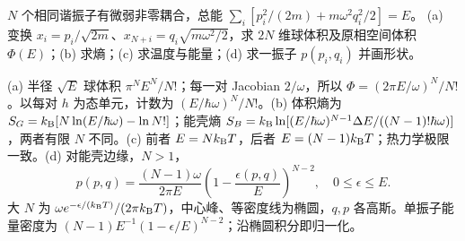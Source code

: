 \begin{exercise}
$N$ 个相同谐振子有微弱非零耦合，总能 $\sum_i[p_i^2/(2m)+m\omega^2q_i^2/2]=E$。
(a) 变换 $x_i=p_i/\sqrt{2m}$、$x_{N+i}=q_i\sqrt{m\omega^2/2}$，求 $2N$ 维球体积及原相空间体积 $\Phi(E)$；(b) 求熵；(c) 求温度与能量；(d) 求一振子 $p(p_i,q_i)$ 并画形状。
\end{exercise}
\begin{solution}
(a) 半径 $\sqrt E$ 球体积 $\pi^NE^N/N!$；每一对 Jacobian $2/\omega$，所以 $\Phi=(2\pi E/\omega)^N/N!$。以每对 $h$ 为态单元，计数为 $(E/\hbar\omega)^N/N!$。(b) 体积熵为 $S_G=k_{\mathrm B}[N\ln(E/\hbar\omega)-\ln N!]$；能壳熵 $S_B=k_{\mathrm B}\ln[(E/\hbar\omega)^{N-1}\Delta E/((N-1)!\hbar\omega)]$，两者有限 $N$ 不同。(c) 前者 $E=Nk_{\mathrm B} T$，后者 $E=(N-1)k_{\mathrm B} T$；热力学极限一致。(d) 对能壳边缘，$N>1$，
\[p(p,q)=\frac{(N-1)\omega}{2\pi E}\left(1-\frac{\epsilon(p,q)}E\right)^{N-2},\quad0\le\epsilon\le E.\]
大 $N$ 为 $\omega e^{-\epsilon/(k_{\mathrm B} T)}/(2\pi k_{\mathrm B} T)$，中心峰、等密度线为椭圆，$q,p$ 各高斯。单振子能量密度为 $(N-1)E^{-1}(1-\epsilon/E)^{N-2}$；沿椭圆积分即归一化。
\end{solution}
\begin{center}\end{center}
